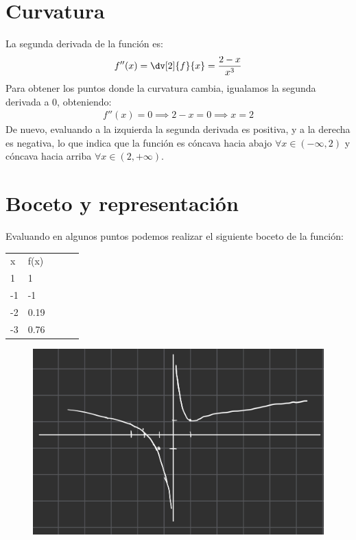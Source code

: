 \documentclass{article}
\begin{document}
\section{Curvatura}
La segunda derivada de la función es:
\begin{equation}
	\begin{split}
		f''(x) = \dv[2]{f}{x}= \frac{2-x}{x^{3}}
	\end{split}
\end{equation}
Para obtener los puntos donde la curvatura cambia, igualamos la segunda derivada a \(0\),
obteniendo:
\begin{equation}
	\begin{split}
		f''(x)=0 \implies 2-x = 0 \implies x = 2
	\end{split}
\end{equation}
De nuevo, evaluando a la izquierda la segunda derivada es positiva, y a la derecha es negativa,
lo que indica que la función es cóncava hacia abajo \(\forall x \in (-\infty, 2)\) y cóncava
hacia arriba \(\forall x \in (2,+\infty)\).
\section{Boceto y representación}
Evaluando en algunos puntos podemos realizar el siguiente boceto de la función:
\begin{table}[h]
	\begin{tabular}{lllll}
	x & f(x)\\
	1 & 1\\
	-1 & -1\\
	-2 & 0.19 \\
	-3 & 0.76
	\end{tabular}
\end{table}
\begin{figure}[h]
	\includegraphics[scale=0.25]{../images/20241228_134027000_iOS.jpg}
\end{figure}
\end{document}
